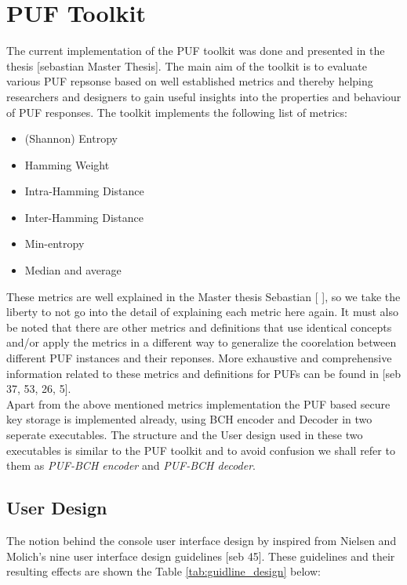 \section{PUF Toolkit}
The current implementation of the PUF toolkit was done and presented in the thesis [sebastian Master Thesis]. The main aim of the toolkit is to evaluate various PUF repsonse based on well established metrics and thereby helping researchers and designers to gain useful insights into the properties and behaviour of PUF responses. The toolkit implements the following list of metrics: \pagebreak

\begin{itemize}
	\item (Shannon) Entropy
	\item Hamming Weight
	\item Intra-Hamming Distance
	\item Inter-Hamming Distance
	\item Min-entropy
	\item Median and average
\end{itemize}

These metrics are well explained in the Master thesis Sebastian [ ], so we take the liberty to not go into the detail of explaining each metric here again. It must also be noted that there are other metrics and definitions that use identical concepts and/or apply the metrics in a different way to generalize the coorelation between different PUF instances and their reponses. More exhaustive and comprehensive information related to these metrics and definitions for PUFs can be found in [seb 37, 53, 26, 5].\\

Apart from the above mentioned metrics implementation the PUF based secure key storage is implemented already, using BCH encoder and Decoder in two seperate executables. The structure and the User design used in these two executables is similar to the PUF toolkit and to avoid confusion we shall refer to them as \emph{PUF-BCH encoder} and \emph{PUF-BCH decoder}.\\

\subsection{User Design}

The notion behind the console user interface design by inspired from Nielsen and Molich's nine user interface design guidelines [seb 45]. These guidelines and their resulting effects are shown the Table \ref{tab:guidline_design} below:

